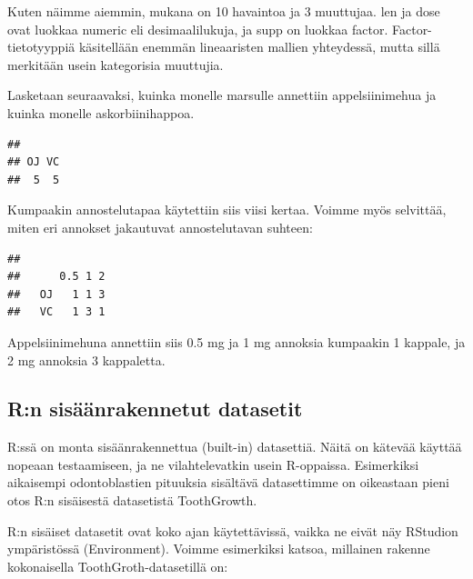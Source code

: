 \documentclass[
]{book}
\newenvironment{Shaded}{\begin{snugshade}}{\end{snugshade}}
\newcommand{\FunctionTok}[1]{\textcolor[rgb]{0.00,0.00,0.00}{#1}}
\newcommand{\NormalTok}[1]{#1}
\newcommand{\SpecialCharTok}[1]{\textcolor[rgb]{0.00,0.00,0.00}{#1}}
\begin{document}
Kuten näimme aiemmin, mukana on 10 havaintoa ja 3 muuttujaa. len ja dose ovat luokkaa numeric eli desimaalilukuja, ja supp on luokkaa factor. Factor-tietotyyppiä käsitellään enemmän lineaaristen mallien yhteydessä, mutta sillä merkitään usein kategorisia muuttujia.

Lasketaan seuraavaksi, kuinka monelle marsulle annettiin appelsiinimehua ja kuinka monelle askorbiinihappoa.

\begin{Shaded}
\end{Shaded}

\begin{verbatim}
## 
## OJ VC 
##  5  5
\end{verbatim}

Kumpaakin annostelutapaa käytettiin siis viisi kertaa. Voimme myös selvittää, miten eri annokset jakautuvat annostelutavan suhteen:

\begin{Shaded}
\end{Shaded}

\begin{verbatim}
##     
##      0.5 1 2
##   OJ   1 1 3
##   VC   1 3 1
\end{verbatim}

Appelsiinimehuna annettiin siis 0.5 mg ja 1 mg annoksia kumpaakin 1 kappale, ja 2 mg annoksia 3 kappaletta.

\hypertarget{rn-sisuxe4uxe4nrakennetut-datasetit}{%
\subsection{R:n sisäänrakennetut datasetit}\label{rn-sisuxe4uxe4nrakennetut-datasetit}}

R:ssä on monta sisäänrakennettua (built-in) datasettiä. Näitä on kätevää käyttää nopeaan testaamiseen, ja ne vilahtelevatkin usein R-oppaissa. Esimerkiksi aikaisempi odontoblastien pituuksia sisältävä datasettimme on oikeastaan pieni otos R:n sisäisestä datasetistä ToothGrowth.

R:n sisäiset datasetit ovat koko ajan käytettävissä, vaikka ne eivät näy RStudion ympäristössä (Environment). Voimme esimerkiksi katsoa, millainen rakenne kokonaisella ToothGroth-datasetillä on:
\end{document}
